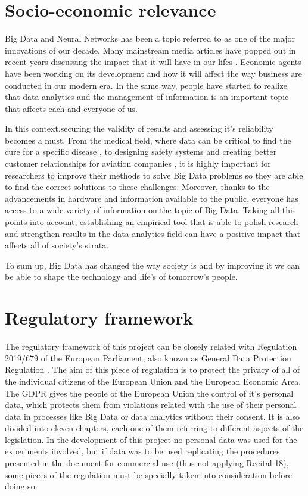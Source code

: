 \section{Socio-economic relevance}

Big Data and Neural Networks has been a topic referred to as one of the major innovations of our decade. Many mainstream media articles have popped out in recent years discussing the impact that it will have in our lifes \cite{Forbes_Article}. Economic agents have been working on its development and how it will affect the way business are conducted in our modern era. In the same way, people have started to realize that data analytics and the management of information is an important topic that affects each and everyone of us. \par

In this context,securing the validity of results and assessing it's reliability becomes a must. From the medical field, where data can be critical to find the cure for a specific disease \cite{Nature_Article}, to designing safety systems and creating better customer relationships for aviation companies \cite{Article_Aviation}, it is highly important for researchers to improve their methods to solve Big Data problems so they are able to find the correct solutions to these challenges. Moreover, thanks to the advancements in hardware and information available to the public, everyone has access to a wide variety of information on the topic of Big Data. Taking all this points into account, establishing an empirical tool that is able to polish research and strengthen results in the data analytics field can have a positive impact that affects all of society's strata.

To sum up, Big Data has changed the way society is and by improving it we can be able to shape the technology and life's of tomorrow's people.

\section{Regulatory framework}

The regulatory framework of this project can be closely related with Regulation 2019/679 of the European Parliament, also known as General Data Protection Regulation \cite{GDPR}. The aim of this piece of regulation is to protect the privacy of all of the individual citizens of the European Union and the European Economic Area. The GDPR gives the people of the European Union the control of it's personal data, which protects them from violations related with the use of their personal data in processes like Big Data or data analytics without their consent. It is also divided into eleven chapters, each one of them referring to different aspects of the legislation. In the development of this project no personal data was used for the experiments involved, but if data was to be used replicating the procedures presented in the document for commercial use (thus not applying Recital 18), some pieces of the regulation must be specially taken into consideration before doing so. \newline

